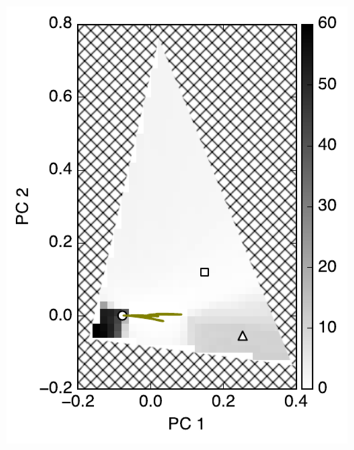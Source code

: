\documentclass[iop,numberedappendix,apj]{emulateapj}
\begin{document}
\begin{figure}[tbh!]
   \begin{minipage}{0.33\hsize}
    \begin{center}
\includegraphics[width=\hsize]{mockdata_90deg_3types_t360_lc_noreg_allowedregion_gray.pdf}
    \end{center}
     \end{minipage}   
    \begin{minipage}{0.33\hsize}
    \begin{center}

\end{center}
\end{minipage}
\end{figure}
\end{document}

